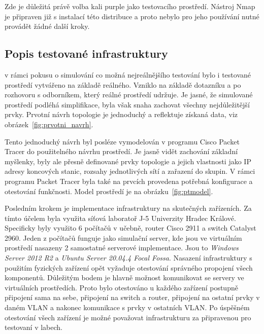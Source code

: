 Zde je důležitá právě volba kali purple jako testovacího prostředí.
Nástroj Nmap je připraven již s instalací této distribuce a proto nebylo pro jeho používání nutné provádět žádné další kroky.


\subsection{Popis testované infrastruktury}\label{subsec:popis-testovane-infrastruktury}
v rámci pokusu o simulování co možná nejreálnějšího testování bylo i testované prostředí vytvářeno na základě reálného.
Vzniklo na základě dotazníku a po rozhovoru s odborníkem, který reálné prostředí udržuje.
Je jasné, že simulované prostředí podléhá simplifikace, byla však snaha zachovat všechny nejdůležitější prvky.
Prvotní návrh topologie je jednoduchý a reflektuje získaná data, viz obrázek~\ref{fig:prvotni_navrh}.


Tento jednoduchý návrh byl posléze vymodelován v programu Cisco Packet Tracer do použitelného návrhu prostředí.
Je jasně vidět zachování základní myšlenky, byly ale přesně definované prvky topologie a jejich vlastnosti jako IP adresy koncových stanic, rozsahy jednotlivých sítí a zařazení do  skupin.
V rámci programu Packet Tracer byla také na prvcích provedena potřebná konfigurace a otestování funkčnosti.
Model prostředí je na obrázku~\ref{fig:ptmodel}.



Posledním krokem je implementace infrastruktury na skutečných zařízeních.
Za tímto účelem byla využita síťová laboratoř J-5 Univerzity Hradec Králové.
Specificky byly využito 6 počítačů v učebně, router Cisco 2911 a switch Catalyst 2960.
Jeden z počítačů funguje jako simulační server, kde jsou ve virtuálním prostředí nasazeny 2 samostatné serverové implementace.
Jsou to \textit{Windows Server 2012 R2} a \textit{Ubuntu Server 20.04.4 Focal Fossa}.
Nasazení infrastruktury s použitím fyzických zařízení opět vyžaduje otestování správného propojení všech komponentů.
Důležitým bodem je hlavně možnost komunikovat se servery ve virtuálních prostředích.
Proto bylo otestováno u každého zařízení postupně připojení sama na sebe, připojení na switch a router, připojení na ostatní prvky v daném \ac{VLAN} a nakonec komunikace s prvky v ostatních \ac{VLAN}.
Po úspěšném otestování všech zařízení je možné považovat  infrastrukturu za připravenou pro testovaní v labech.

